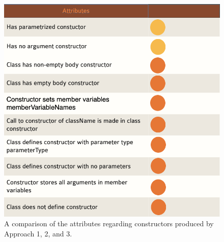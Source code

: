 \documentclass[12pt]{article}
\begin{document}
\begin{figure}
\begin{minipage}{7.5 cm}
\includegraphics[width=\linewidth]{attributeConstructors.png}
\caption{A comparison of the attributes regarding constructors produced by Approach 1, 2, and 3.}
\label{fig:attrConstructor}
\end{minipage}
\end{figure}


\end{document}
